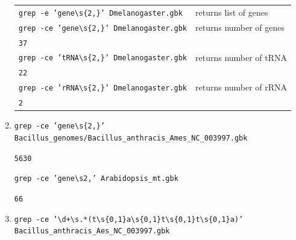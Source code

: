 \documentclass[12pt]{article}
\newcommand{\tb}{\textbackslash}
\begin{document}
\begin{enumerate}
{            \renewcommand{\arraystretch}{1.5}
            \noindent\begin{longtable}{lp{}}
                \texttt{grep -e 'gene\tb s\{2,\}' Dmelanogaster.gbk} & returns list of genes \\
                \texttt{grep -ce 'gene\tb s\{2,\}' Dmelanogaster.gbk} & returns number of genes \\
                \texttt{37} & \\
                \texttt{grep -ce 'tRNA\tb s\{2,\}' Dmelanogaster.gbk} & returns number of tRNA \\
                \texttt{22} & \\
                \texttt{grep -ce 'rRNA\tb s\{2,\}' Dmelanogaster.gbk} & returns number of rRNA \\
                \texttt{2} & \\
                \end{longtable}
        }
    \item \texttt{grep -ce 'gene\tb s\{2,\}' Bacillus\_genomes/Bacillus\_anthracis\_Ames\_NC\_003997.gbk}\par
        \texttt{5630}\par
        \par
        \texttt{grep -ce 'gene\tb s{2,}' Arabidopsis\_mt.gbk}\par
        \texttt{66}\par
    \item \texttt{grep -ce '\tb d+\tb s.*(t\tb s\{0,1\}a\tb s\{0,1\}t\tb s\{0,1\}t\tb s\{0,1\}a)' Bacillus\_anthracis\_Aes\_NC\_003997.gbk} 
\end{enumerate}
\end{document}
